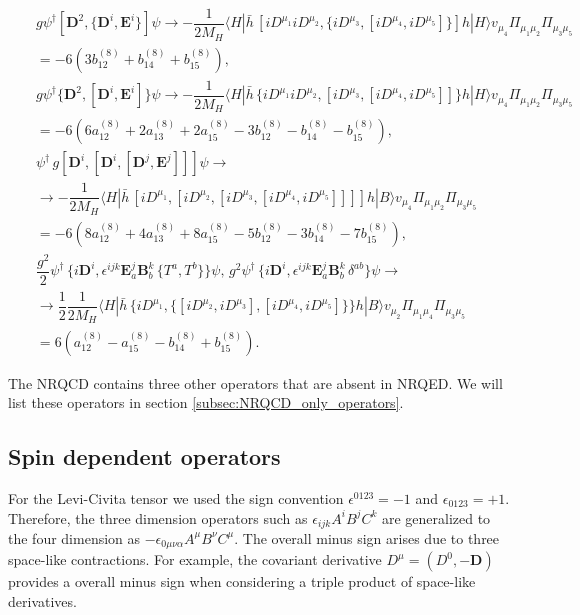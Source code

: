 \begin{eqnarray}\label{eqn:chap4_NRQED_dim8__SI_op}
&&g\psi^\dagger  [ \bm{D}^2 ,  \{\bm{D}^i, \bm{E}^i\} ] \psi\to-\dfrac1{2M_H}\langle H |\bar h\,  [iD^{\mu_1}iD^{\mu_2},\{ iD^{\mu_3},[iD^{\mu_4},iD^{\mu_5}] \}]h|H\rangle v_{\mu_4}\Pi_{\mu_1\mu_2}\Pi_{\mu_3\mu_5}\nonumber\\
&&=-6\left(3b^{(8)}_{12} + b^{(8)}_{14} + b^{(8)}_{15}\right),\nonumber
\end{eqnarray}
\begin{eqnarray}
&&g\psi^\dagger  \{ \bm{D}^2 , [\bm{D}^i, \bm{E}^i]\} \psi\to-\dfrac1{2M_H}\langle H |\bar h\,  \{iD^{\mu_1}iD^{\mu_2},[ iD^{\mu_3},[iD^{\mu_4},iD^{\mu_5}] ]\}h|H\rangle v_{\mu_4}\Pi_{\mu_1\mu_2}\Pi_{\mu_3\mu_5}\nonumber\\
&&=-6\left(6a^{(8)}_{12} +2 a^{(8)}_{13} + 2a^{(8)}_{15}-3b^{(8)}_{12} - b^{(8)}_{14} - b^{(8)}_{15}\right),\nonumber\\
&&\psi^\dagger\, g [\bm{D}^i, [\bm{D}^i, [\bm{D}^j,\bm{E}^j]]] \psi\to\nonumber\\
&&\to -\dfrac1{2M_H}\langle H |\bar h\,  [iD^{\mu_1},[iD^{\mu_2},[ iD^{\mu_3},[iD^{\mu_4},iD^{\mu_5}] ]]]h|B\rangle v_{\mu_4}\Pi_{\mu_1\mu_2}\Pi_{\mu_3\mu_5}\nonumber\\
&&=-6\left(8a^{(8)}_{12} +4 a^{(8)}_{13} + 8a^{(8)}_{15}-5b^{(8)}_{12} - 3b^{(8)}_{14} - 7b^{(8)}_{15}\right),\nonumber\\
&&\dfrac{g^2}{2}\psi^\dagger\,  \{i \bm{D}^i , \epsilon^{ijk}\bm{E}_a^j\bm{B}_b^k\,\{T^a,T^b\}\}\psi,\,g^2\psi^\dagger\,  \{i \bm{D}^i , \epsilon^{ijk}\bm{E}_a^j\bm{B}_b^k\,\delta^{ab}\}\psi\to\nonumber\\
&&\to\dfrac12\dfrac1{2M_H}\langle H |\bar h\,  \{iD^{\mu_1},\{[iD^{\mu_2}, iD^{\mu_3}],[iD^{\mu_4},iD^{\mu_5}] \}\}h|B\rangle v_{\mu_2}\Pi_{\mu_1\mu_4}\Pi_{\mu_3\mu_5}\nonumber\\
&&=6\left(a^{(8)}_{12} -a^{(8)}_{15}- b^{(8)}_{14} + b^{(8)}_{15}\right).
\end{eqnarray}

The NRQCD contains three other operators that are absent in NRQED. We will list these operators in section \ref{subsec:NRQCD_only_operators}.

\subsection{Spin dependent operators}

For the Levi-Civita tensor we used the sign convention $\epsilon^{0123}=-1$ and $\epsilon_{0123}=+1$. Therefore, the three dimension operators such as $\epsilon_{i j k} A^{i} B^{j} C^{k}$ are generalized to the four dimension as $-\epsilon_{0 \mu \nu \alpha} A^{\mu} B^{\nu} C^{\mu}$. The overall minus sign arises due to three space-like contractions. For example, the covariant derivative $D^{\mu}=(D^0,-\bm{D})$ provides a overall minus sign when considering a triple product of space-like derivatives.
\vspace{-0.5cm}
